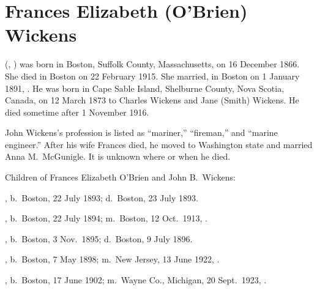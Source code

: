 \section{Frances Elizabeth (O'Brien) Wickens}

 (, ) was born in Boston, Suffolk County, Massachusetts, on 16 December 1866.\cite{Frances3OBrienBirth} She died in Boston on 22 February 1915.\cite{Frances3OBrienDeath} She married, in Boston on 1 January 1891, .\cite{JohnWickensMarriage} He was born in Cape Sable Island, Shelburne County, Nova Scotia, Canada, on 12 March 1873\cite{JohnWickensNaturalization} to Charles Wickens and Jane (Smith) Wickens.\cite{JohnWickensMarriage,JohnWickensMarriage2} He died sometime after 1 November 1916.\cite{JohnWickensMarriage2}

John Wickens's profession is listed as ``mariner,''\cite{JohnWickensMarriage} ``fireman,''\cite{JohnWickensNaturalization} and ``marine engineer.''\cite{Census1900JohnWickens} After his wife Frances died, he moved to Washington state and married Anna M.\ McGunigle.\cite{JohnWickensMarriage2} It is unknown where or when he died.

\begin{KidsIntro}
	Children of Frances Elizabeth O'Brien and John B.\ Wickens:
\end{KidsIntro}

\begin{Kids}
	, b.\ Boston, 22 July 1893;\cite{Nellie4WickensDeath} d.\ Boston, 23 July 1893.\cite{Nellie4WickensDeath}
	
	, b.\ Boston, 22 July 1894; m.\ Boston, 12 Oct.\ 1913, .
	
	, b.\ Boston, 3 Nov.\ 1895;\cite{Frederick4WickensBirth} d.\ Boston, 9 July 1896.\cite{Frederick4WickensDeath}
	
	, b.\ Boston, 7 May 1898; m.\ New Jersey, 13 June 1922, .
	
	, b.\ Boston, 17 June 1902; m.\ Wayne Co., Michigan, 20 Sept.\ 1923, .
	
\end{Kids}